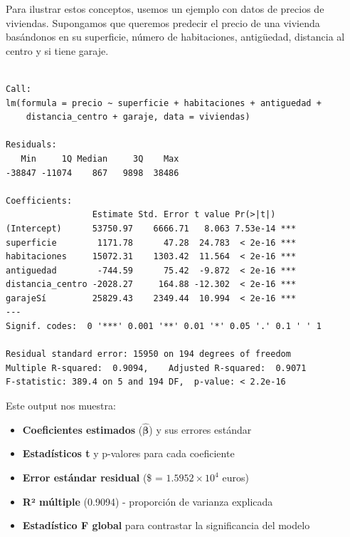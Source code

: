 \documentclass[
  letterpaper,
  DIV=11,
  numbers=noendperiod]{scrreprt}
\providecommand{\tightlist}{%
  \setlength{\itemsep}{0pt}\setlength{\parskip}{0pt}}
\begin{document}
\begin{tcolorbox}[enhanced jigsaw, leftrule=.75mm, breakable, colbacktitle=quarto-callout-tip-color!10!white, bottomrule=.15mm, colframe=quarto-callout-tip-color-frame, toprule=.15mm, colback=white, coltitle=black, bottomtitle=1mm, left=2mm, title=\textcolor{quarto-callout-tip-color}{\faLightbulb}\hspace{0.5em}{Ejemplo: Estimación de un modelo múltiple}, opacityback=0, arc=.35mm, opacitybacktitle=0.6, toptitle=1mm, titlerule=0mm, rightrule=.15mm]

Para ilustrar estos conceptos, usemos un ejemplo con datos de precios de
viviendas. Supongamos que queremos predecir el precio de una vivienda
basándonos en su superficie, número de habitaciones, antigüedad,
distancia al centro y si tiene garaje.

\begin{verbatim}

Call:
lm(formula = precio ~ superficie + habitaciones + antiguedad + 
    distancia_centro + garaje, data = viviendas)

Residuals:
   Min     1Q Median     3Q    Max 
-38847 -11074    867   9898  38486 

Coefficients:
                 Estimate Std. Error t value Pr(>|t|)    
(Intercept)      53750.97    6666.71   8.063 7.53e-14 ***
superficie        1171.78      47.28  24.783  < 2e-16 ***
habitaciones     15072.31    1303.42  11.564  < 2e-16 ***
antiguedad        -744.59      75.42  -9.872  < 2e-16 ***
distancia_centro -2028.27     164.88 -12.302  < 2e-16 ***
garajeSí         25829.43    2349.44  10.994  < 2e-16 ***
---
Signif. codes:  0 '***' 0.001 '**' 0.01 '*' 0.05 '.' 0.1 ' ' 1

Residual standard error: 15950 on 194 degrees of freedom
Multiple R-squared:  0.9094,    Adjusted R-squared:  0.9071 
F-statistic: 389.4 on 5 and 194 DF,  p-value: < 2.2e-16
\end{verbatim}

Este output nos muestra:

\begin{itemize}
\tightlist
\item
  \textbf{Coeficientes estimados} (\(\hat{\boldsymbol{\beta}}\)) y sus
  errores estándar
\item
  \textbf{Estadísticos t} y p-valores para cada coeficiente
\item
  \textbf{Error estándar residual} (\$\hat{\sigma} =
  \ensuremath{1.5952\times 10^{4}} euros)
\item
  \textbf{R² múltiple} (0.9094) - proporción de varianza explicada
\item
  \textbf{Estadístico F global} para contrastar la significancia del
  modelo
\end{itemize}

\end{tcolorbox}
\end{document}
